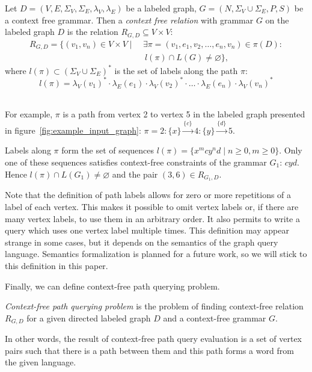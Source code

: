 \begin{definition}
Let $D = (V, E, \Sigma_V, \Sigma_E, \lambda_V, \lambda_E)$ be a labeled graph, $G = (N, \Sigma_V \cup \Sigma_E, P, S)$ be a context free grammar. Then a \emph{context free relation} with grammar $G$ on the labeled graph $D$ is the relation $R_{G, D} \subseteq V \times V$:
\begin{equation*} \label{eq1}
\begin{split}
R_{G, D} = \{(v_1, v_n) \in V \times V  \mid \ &\exists \pi = (v_1, e_1, v_2, \ldots, e_n, v_n) \in \pi(D): \\
      &\ l(\pi) \cap L(G) \neq \varnothing \},
\end{split}
\end{equation*}
where $l(\pi) \subset (\Sigma_V \cup \Sigma_E)^*$ is the set of labels along the path $\pi$:
$$l(\pi) = \lambda_V(v_1)^* \cdot \lambda_E(e_1) \cdot \lambda_V(v_2)^* \cdot \ldots \cdot \lambda_E(e_n) \cdot \lambda_V(v_n)^*$$
\
\end{definition}

For example, $\pi$ is a path from vertex 2 to vertex 5 in the labeled graph presented in figure~\ref{fig:example_input_graph}:
$\pi=2:\{x\}\xrightarrow{\{c\}} 4:\{y\} \xrightarrow{\{d\}} 5.$

Labels along $\pi$ form the set of sequences $l(\pi) = \{x^mcy^nd \mid n \geq 0, m \geq 0\}$.
Only one of these sequences satisfies context-free constraints of the grammar $G_1$: $cyd$.
Hence $l(\pi) \cap L(G_1) \neq \varnothing$ and the pair $(3,6) \in R_{G_1, D}$.

Note that the definition of path labels allows for zero or more repetitions of a label of each vertex.
This makes it possible to omit vertex labels or, if there are many vertex labels, to use them in an arbitrary order.
It also permits to write a query which uses one vertex label multiple times.
This definition may appear strange in some cases, but it depends on the semantics of the graph query language.
Semantics formalization is planned for a future work, so we will stick to this definition in this paper.

Finally, we can define context-free path querying problem.
\begin{definition}
    \emph{Context-free path querying problem} is the problem of finding context-free relation $R_{G, D}$ for a given directed labeled graph $D$ and a context-free grammar $G$.
\end{definition}

In other words, the result of context-free path query evaluation is a set of vertex pairs such that there is a path between them and this path forms a word from the given language.

